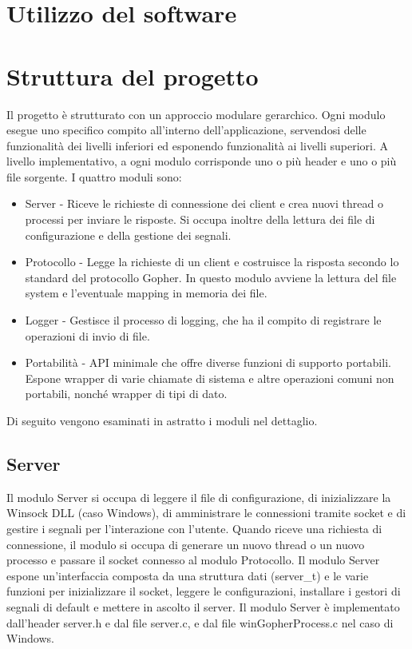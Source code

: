 \documentclass{article}
\begin{document}
\tableofcontents

\section{Utilizzo del software}

\section{Struttura del progetto}

Il progetto è strutturato con un approccio modulare gerarchico. 
Ogni modulo esegue uno specifico compito all'interno dell'applicazione, servendosi delle funzionalità
dei livelli inferiori ed esponendo funzionalità ai livelli superiori.
A livello implementativo, a ogni modulo corrisponde uno o più header e uno o più file sorgente.
I quattro moduli sono:
\begin{itemize}
    \item Server - Riceve le richieste di connessione dei client e crea nuovi thread 
    o processi per inviare le risposte. Si occupa inoltre della lettura dei file di configurazione e 
    della gestione dei segnali.
    \item Protocollo - Legge la richieste di un client e costruisce la risposta secondo lo standard del
    protocollo Gopher. In questo modulo avviene la lettura del file system e l'eventuale mapping 
    in memoria dei file.
    \item Logger - Gestisce il processo di logging, che ha il compito di registrare le operazioni di invio
    di file.
    \item Portabilità - API minimale che offre diverse funzioni di supporto portabili. Espone wrapper
    di varie chiamate di sistema e altre operazioni comuni non portabili, nonché wrapper di tipi di dato.
\end{itemize} 
Di seguito vengono esaminati in astratto i moduli nel dettaglio.

\subsection{Server}
Il modulo Server si occupa di leggere il file di configurazione, di inizializzare la Winsock DLL 
(caso Windows), di amministrare le connessioni tramite socket e di gestire i 
segnali per l'interazione con l'utente.
Quando riceve una richiesta di connessione, il modulo si occupa di generare un nuovo thread o un nuovo processo
e passare il socket connesso al modulo Protocollo.
Il modulo Server espone un'interfaccia composta da una struttura dati (server\_t) e le 
varie funzioni per inizializzare il socket, leggere le configurazioni, installare i 
gestori di segnali di default e mettere in ascolto il server.  
Il modulo Server è implementato dall'header server.h e dal file server.c, e 
dal file winGopherProcess.c nel caso di Windows.
\end{document}
